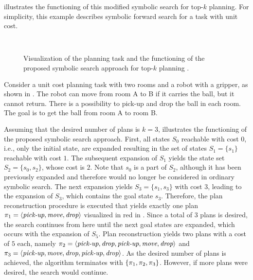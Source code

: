  illustrates the functioning of this modified symbolic search for top-$k$ planning.
For simplicity, this example describes symbolic forward search for a task with unit cost.

\begin{figure}
    \centering
    \\ \medskip
    \caption[Visualization of symbolic search for top-$k$ planning.]{Visualization of the  planning task and the functioning of the proposed symbolic search approach for top-$k$ planning \autocite{speck-et-al-aaai2020}.}
    \label{fig:gripper_example}
\end{figure}

\begin{example}\label{ex:gripper}
    Consider a unit cost planning task with two rooms and a robot with a gripper, as shown in .
    The robot can move from room A to B if it carries the ball, but it cannot return.
    There is a possibility to pick-up and drop the ball in each room.
    The goal is to get the ball from room A to room B.

    Assuming that the desired number of plans is $k = 3$,  illustrates the functioning of the proposed symbolic search approach.
    First, all states $S_0$ reachable with cost $0$, i.e., only the initial state, are expanded resulting in the set of states $S_1 = \{s_1 \}$ reachable with cost $1$.
    The subsequent expansion of $S_1$ yields the state set $S_2 = \{ s_0, s_2 \}$, whose cost is $2$.
    Note that $s_0$ is a part of $S_2$, although it has been previously expanded and therefore would no longer be considered in ordinary symbolic search.
    The next expansion yields $S_3 = \{ s_1, s_3 \}$ with cost $3$, leading to the expansion of $S_3$, which contains the goal state $s_3$.
    Therefore, the plan reconstruction procedure is executed that yields exactly one plan $\pi_1 = \langle \textit{pick-up}, \textit{move}, \textit{drop} \rangle$ visualized in red in .
    Since a total of $3$ plans is desired, the search continues from here until the next goal states are expanded, which occurs with the expansion of $S_5$.
    Plan reconstruction yields two plans with a cost of $5$ each, namely $\pi_2 = \langle \textit{pick-up}, \textit{drop}, \textit{pick-up}, \textit{move}, \textit{drop} \rangle$ and $\pi_3 = \langle \textit{pick-up}, \textit{move}, \textit{drop}, \textit{pick-up},  \textit{drop} \rangle$.
    As the desired number of plans is achieved, the algorithm terminates with $\{\pi_1, \pi_2, \pi_3\}$.
    However, if more plans were desired, the search would continue.
\end{example}

